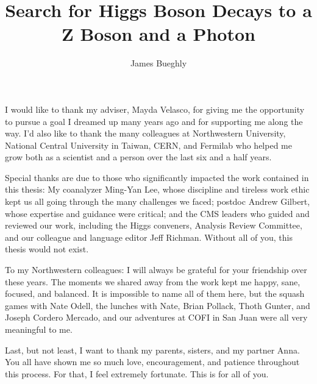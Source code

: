 \documentclass[12pt]{template/nuthesis}
\author{James Bueghly}
\title{Search for Higgs Boson Decays to a Z Boson and a Photon}
\begin{document}
%	
%


\frontmatter		%

\maketitle		%

\copyrightpage		%




\acknowledgements	%

I would like to thank my adviser, Mayda Velasco, for giving me the opportunity to pursue a goal I dreamed up many years ago and for supporting me along the way. I'd also like to thank the many colleagues at Northwestern University, National Central University in Taiwan, CERN, and Fermilab who helped me grow both as a scientist and a person over the last six and a half years. 

Special thanks are due to those who significantly impacted the work contained in this thesis: My coanalyzer Ming-Yan Lee, whose discipline and tireless work ethic kept us all going through the many challenges we faced; postdoc Andrew Gilbert, whose expertise and guidance were critical; and the CMS leaders who guided and reviewed our work, including the Higgs conveners, Analysis Review Committee, and our colleague and language editor Jeff Richman. Without all of you, this thesis would not exist.

To my Northwestern colleagues: I will always be grateful for your friendship over these years. The moments we shared away from the work kept me happy, sane, focused, and balanced. It is impossible to name all of them here, but the squash games with Nate Odell, the lunches with Nate, Brian Pollack, Thoth Gunter, and Joseph Cordero Mercado, and our adventures at COFI in San Juan were all very meaningful to me. 

Last, but not least, I want to thank my parents, sisters, and my partner Anna. You all have shown me so much love, encouragement, and patience throughout this process. For that, I feel extremely fortunate. This is for all of you. 



%


%
%
%
%
%
%
%
%
\end{document}
